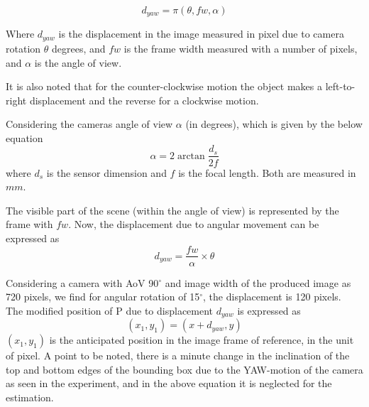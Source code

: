\begin{equation} \label{yaw-displacement}
{d_{yaw}} = \pi({\theta , fw, \alpha})
\end{equation}

Where ${d_{yaw}}$ is the displacement in the image measured in pixel due to camera rotation ${\theta}$ degrees, and $fw$ is the frame width measured with a number of pixels, and $\alpha$ is the angle of view.

It is also noted that for the counter-clockwise motion the object makes a left-to-right displacement and the reverse for a clockwise motion. 

Considering the cameras angle of view $\alpha$ (in degrees), which is given by the below equation
\begin{equation} \label{angle-of-view}
\alpha =2\arctan {\frac {d_s}{2f}}
\end{equation}
where ${d_s}$ is the sensor dimension and $f$ is the focal length. Both are measured in $mm$.

The visible part of the scene (within the angle of view) is represented by the frame with $fw$. Now, the displacement due to angular movement can be expressed as
\begin{equation} \label{yaw-displacement-detail}
{d_{yaw}} = \frac {fw}{\alpha} \times {\theta}
\end{equation}

Considering a camera with AoV 90$^{\circ}$ and image width of the produced image as 720 pixels, we find for angular rotation of 15$^{\circ}$, the displacement is 120 pixels. \\
 
The modified position of P due to displacement ${d_{yaw}}$ is expressed as
\begin{equation} \label{new-xy}
(x_1, y_1) = (x + d_{yaw}, y)
\end{equation}
$(x_1, y_1)$ is the anticipated position in the image frame of reference, in the unit of pixel.
A point to be noted, there is a minute change in the inclination of the top and bottom edges of the bounding box due to the YAW-motion of the camera as seen in the experiment, and in the above equation it is neglected for the estimation.


